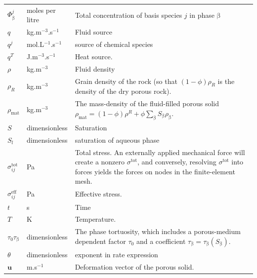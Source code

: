 \documentclass[12pt]{report}
\def\phase{\mathrm{\beta}}
\begin{document}
\begin{longtable}{llp{10cm}}
$\Phi_{\phase}^{j}$ & moles per litre & Total concentration of basis
species $j$ in phase $\phase$ \\

$q$ & kg.m$^{-3}$.s$^{-1}$ & Fluid source \\

$q^{j}$ & mol.L$^{-1}$.s$^{-1}$ & source of chemical species \\

$q^{T}$ & J.m$^{-3}$.s$^{-1}$ & Heat source. \\

$\rho$ & kg.m$^{-3}$ & Fluid density \\

$\rho_{R}$ & kg.m$^{-3}$ & Grain density of the rock (so that
$(1-\phi)\rho_{R}$ is the density of the dry porous rock). \\

$\rho_{\mathrm{mat}}$ & kg.m$^{-3}$ & The mass-density of the
fluid-filled porous solid $\rho_{\mathrm{mat}} = (1 - \phi)\rho^{R} +
\phi\sum_{\phase}S_{\phase}\rho_{\phase}$. \\


$S$ & dimensionless & Saturation \\

$S_{l}$ & dimensionless & saturation of aqueous phase \\


$\sigma^{\mathrm{tot}}_{ij}$ & Pa & Total stress.  An
externally applied mechanical force will create a nonzero
$\sigma^{\mathrm{tot}}$, and conversely, resolving
$\sigma^{\mathrm{tot}}$ into forces yields the forces on nodes in the
finite-element mesh. \\

$\sigma^{\mathrm{eff}}_{ij}$ & Pa & Effective stress. \\

$t$ & s & Time \\

$T$ & K & Temperature. \\

$\tau_{0}\tau_{\phase}$ & dimensionless & The phase tortuosity, which
includes a porous-medium dependent factor $\tau_{0}$ and a coefficient
$\tau_{\phase}=\tau_{\phase}(S_{\phase})$. \\

$\theta$ & dimensionless & exponent in rate expression \\

${\mathbf{u}}$ & m.s$^{-1}$ & Deformation vector of the porous solid. \\


\end{longtable}
\end{document}
